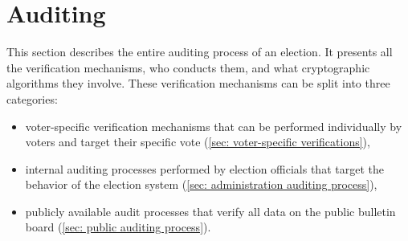 \section{Auditing} \label{sec: auditing}
This section describes the entire auditing process of an election. It presents all the verification mechanisms, who conducts them, and what cryptographic algorithms they involve. These verification mechanisms can be split into three categories:
\begin{itemize}
    \item voter-specific verification mechanisms that can be performed individually by voters and target their specific vote (\cref{sec: voter-specific verifications}),
    \item internal auditing processes performed by election officials that target the behavior of the election system (\cref{sec: administration auditing process}),
    \item publicly available audit processes that verify all data on the public bulletin board (\cref{sec: public auditing process}).
\end{itemize}
